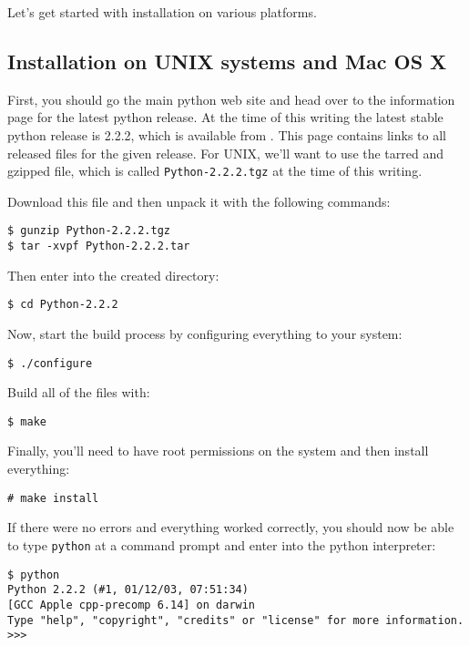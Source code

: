 \documentclass{article}
\begin{document}
Let's get started with installation on various platforms.

\subsection{Installation on UNIX systems and Mac OS X}

First, you should go the main python web site and head over to the information
page for the latest python release. At the time of this writing the
latest stable python release is 2.2.2, which is available from
. This page contains links
to all released files for the given release. For UNIX, we'll want to use
the tarred and gzipped file, which is called \verb|Python-2.2.2.tgz| at
the time of this writing.

Download this file and then unpack it with the following commands:

\begin{verbatim}
$ gunzip Python-2.2.2.tgz 
$ tar -xvpf Python-2.2.2.tar 
\end{verbatim}

Then enter into the created directory:

\begin{verbatim}
$ cd Python-2.2.2
\end{verbatim}

Now, start the build process by configuring everything to your system:

\begin{verbatim}
$ ./configure
\end{verbatim}

Build all of the files with:

\begin{verbatim}
$ make
\end{verbatim}

Finally, you'll need to have root permissions on the system and then
install everything:

\begin{verbatim}
# make install
\end{verbatim}

If there were no errors and everything worked correctly, you should now
be able to type \verb|python| at a command prompt and enter into the
python interpreter:

\begin{verbatim}
$ python
Python 2.2.2 (#1, 01/12/03, 07:51:34) 
[GCC Apple cpp-precomp 6.14] on darwin
Type "help", "copyright", "credits" or "license" for more information.
>>> 
\end{verbatim}
\end{document}
